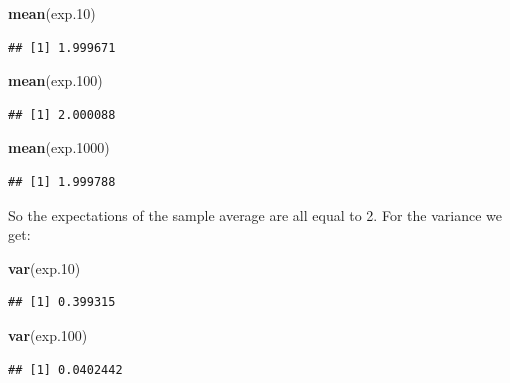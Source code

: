 \documentclass[
]{krantz}
\makeatletter
\newenvironment{Shaded}{\begin{snugshade}}{\end{snugshade}}
\newcommand{\FloatTok}[1]{\textcolor[rgb]{0.00,0.00,0.81}{#1}}
\newcommand{\KeywordTok}[1]{\textcolor[rgb]{0.13,0.29,0.53}{\textbf{#1}}}
\newcommand{\NormalTok}[1]{#1}
\newenvironment{kframe}{%
\medskip{}
\setlength{\fboxsep}{.8em}
 \def\at@end@of@kframe{}%
 \ifinner\ifhmode%
  \def\at@end@of@kframe{\end{minipage}}%
  \begin{minipage}{\columnwidth}%
 \fi\fi%
 \def\FrameCommand##1{\hskip\@totalleftmargin \hskip-\fboxsep
 \colorbox{shadecolor}{##1}\hskip-\fboxsep
     \hskip-\linewidth \hskip-\@totalleftmargin \hskip\columnwidth}%
 \MakeFramed {\advance\hsize-\width
   \@totalleftmargin\z@ \linewidth\hsize
   \@setminipage}}%
 {\par\unskip\endMakeFramed%
 \at@end@of@kframe}
\renewenvironment{Shaded}{\begin{kframe}}{\end{kframe}}
\theoremstyle{definition}
\theoremstyle{definition}
\theoremstyle{definition}
\theoremstyle{remark}
\makeatother
\begin{document}
\begin{Shaded}
\begin{Highlighting}[]
\KeywordTok{mean}\NormalTok{(exp}\FloatTok{.10}\NormalTok{)}
\end{Highlighting}
\end{Shaded}

\begin{verbatim}
## [1] 1.999671
\end{verbatim}

\begin{Shaded}
\begin{Highlighting}[]
\KeywordTok{mean}\NormalTok{(exp}\FloatTok{.100}\NormalTok{)}
\end{Highlighting}
\end{Shaded}

\begin{verbatim}
## [1] 2.000088
\end{verbatim}

\begin{Shaded}
\begin{Highlighting}[]
\KeywordTok{mean}\NormalTok{(exp}\FloatTok{.1000}\NormalTok{)}
\end{Highlighting}
\end{Shaded}

\begin{verbatim}
## [1] 1.999788
\end{verbatim}

So the expectations of the sample average are all equal to 2. For the
variance we get:

\begin{Shaded}
\begin{Highlighting}[]
\KeywordTok{var}\NormalTok{(exp}\FloatTok{.10}\NormalTok{)}
\end{Highlighting}
\end{Shaded}

\begin{verbatim}
## [1] 0.399315
\end{verbatim}

\begin{Shaded}
\begin{Highlighting}[]
\KeywordTok{var}\NormalTok{(exp}\FloatTok{.100}\NormalTok{)}
\end{Highlighting}
\end{Shaded}

\begin{verbatim}
## [1] 0.0402442
\end{verbatim}
\end{document}
